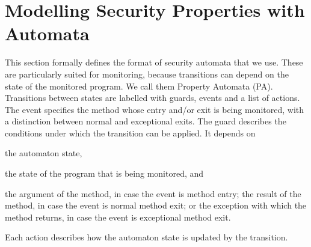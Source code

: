 \section{Modelling Security Properties with Automata}\label{SecMVA}

This section formally defines the format of security automata that we
use. These are particularly suited for monitoring, because transitions
can depend on the state of the monitored program. We call them
Property Automata (PA).  
Transitions between states are labelled with guards, events and a list
of actions. The event specifies the method whose entry and/or exit is
being monitored, with a distinction between normal and exceptional
exits.  The guard describes the conditions under which the transition
can be applied. It depends on
\begin{inparaenum}
\item the automaton state,
\item the state of the program that is being monitored, and
\item the argument of the method, in case the event is method entry;
the result of the method, in case the event is normal method exit; or
the exception with which the method returns, in case the event is
exceptional method exit.
\end{inparaenum}
Each action describes how the automaton state is updated by the transition.

